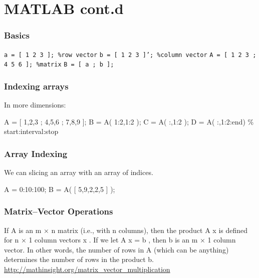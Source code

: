 \documentclass[11pt]{beamer}
\begin{document}
\section{MATLAB cont.d}

\begin{frame}[fragile]
  \frametitle{Basics}
  \Enlarge

  \begin{enumerate}
  \myitem  \texttt{a = [ 1 2 3 ]; \%row vector}
  \myitem  \texttt{b = [ 1 2 3 ]'; \%column vector}
  \myitem  \texttt{A = [ 1 2 3 ; 4 5 6 ]; \%matrix}
  \myitem  \texttt{B = [ a ; b ];  }
  \end{enumerate}
\end{frame}


\begin{frame}[fragile]
  \frametitle{Indexing arrays}
  \Enlarge

  \begin{enumerate}
  \myitem  In more dimensions:
  \end{enumerate}
  \begin{semiverbatim}
A = [ 1,2,3 ; 4,5,6 ; 7,8,9 ];
B = A( 1:2,1:2 );
C = A( :,1:2 );
D = A( :,1:2:end)   \% start:interval:stop
  \end{semiverbatim}
\end{frame}


\begin{frame}[fragile]
  \frametitle{Array Indexing}
  \Enlarge

  \begin{enumerate}
  \myitem  We can slicing an array with an array of indices.
  \end{enumerate}
  \begin{semiverbatim}
A = 0:10:100;
B = A( [ 5,9,2,2,5 ] );
  \end{semiverbatim}
\end{frame}


\begin{frame}[fragile]
	\frametitle{Matrix--Vector Operations}
	\Enlarge
	
	\begin{enumerate}
		\myitem If A is an m × n matrix (i.e., with n columns), then the product A x is defined for n × 1 column vectors x . If we let A x = b , then b is an m × 1 column vector. In other words, the number of rows in A (which can be anything) determines the number of rows in the product b. \url{http://mathinsight.org/matrix_vector_multiplication}
	\end{enumerate}
\end{frame}
\end{document}
